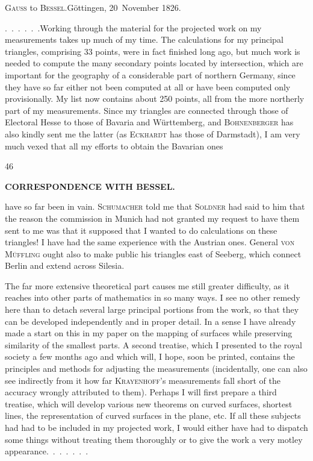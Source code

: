 \begin{center}
\textsc{Gauss} to \textsc{Bessel}.\quad Göttingen, 20~November 1826.
\end{center}

\par\noindent\hspace*{\parindent}.\ .\ .\ .\ .\ .\quad Working through the material for the projected work on my measurements takes up much of my time.
The calculations for my principal triangles, comprising 33 points, were in fact finished long ago, but much work is needed to compute the many secondary points located by intersection, which are important for the geography of a considerable part of northern Germany, since they have so far either not been computed at all or have been computed only provisionally.
My list now contains about 250 points, all from the more northerly part of my measurements.
Since my triangles are connected through those of Electoral Hesse to those of Bavaria and Württemberg, and \textsc{Bohnenberger} has also kindly sent me the latter (as \textsc{Eckhardt} has those of Darmstadt), I am very much vexed that all my efforts to obtain the Bavarian ones
\par\smallskip{}\hfill{\footnotesize46}\par
\clearpage
{}\hfill{\small\textbf{CORRESPONDENCE WITH BESSEL.}}\par\medskip
\noindent have so far been in vain. \textsc{Schumacher} told me that \textsc{Soldner} had said to him that the reason the commission in Munich had not granted my request to have them sent to me was that it supposed that I wanted to do calculations on these triangles!
I have had the same experience with the Austrian ones.
General \textsc{von Müffling} ought also to make public his triangles east of Seeberg, which connect Berlin and extend across Silesia.

\par\noindent\hspace*{\parindent}The far more extensive theoretical part causes me still greater difficulty, as it reaches into other parts of mathematics in so many ways.
I see no other remedy here than to detach several large principal portions from the work, so that they can be developed independently and in proper detail.
In a sense I have already made a start on this in my paper on the mapping of surfaces while preserving similarity of the smallest parts. A second treatise, which I presented to the royal society a few months ago and which will, I hope, soon be printed, contains the principles and methods for adjusting the measurements (incidentally, one can also see indirectly from it how far \textsc{Krayenhoff}'s measurements fall short of the accuracy wrongly attributed to them).
Perhaps I will first prepare a third treatise, which will develop various new theorems on curved surfaces, shortest lines, the representation of curved surfaces in the plane, etc.
If all these subjects had had to be included in my projected work, I would either have had to dispatch some things without treating them thoroughly or to give the work a very motley appearance.\ .\ .\ .\ .\ .\ .
